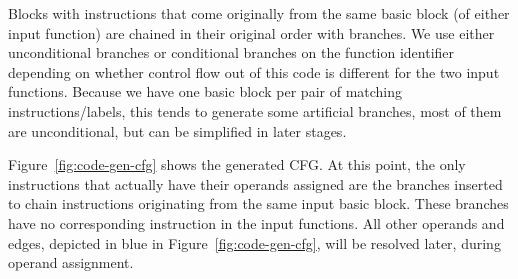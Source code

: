 Blocks with instructions that come originally from the same basic block (of either input function) are chained in their original order with
branches. We use either unconditional branches or conditional branches on the function identifier depending on whether control flow out of
this code is different for the two input functions. Because we have one basic block per pair of matching instructions/labels, this tends to
generate some artificial branches, most of them are unconditional, but can be simplified in later stages.







Figure~\ref{fig:code-gen-cfg} shows the generated CFG. At this point, the only
instructions that actually have their operands assigned are the branches inserted
to chain instructions originating from the same input basic block.
These branches have no corresponding instruction in the input functions.
All other operands and edges, depicted in blue in Figure~\ref{fig:code-gen-cfg},
will be resolved later, during operand assignment.

